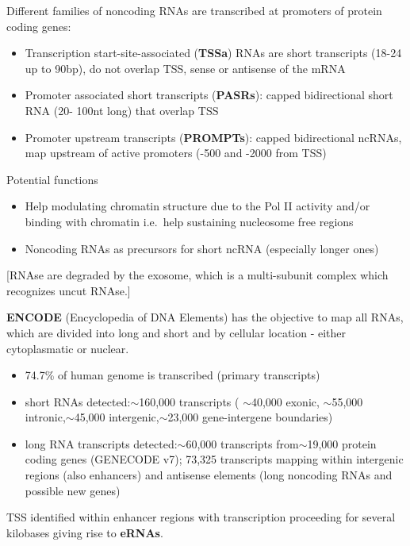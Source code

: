Different families of noncoding RNAs are transcribed at promoters of protein coding genes:

\begin{itemize}
\tightlist
\item
  Transcription start-site-associated (\textbf{TSSa}) RNAs are short transcripts (18-24 up to 90bp), do not overlap TSS, sense or antisense of the mRNA
\item
  Promoter associated short transcripts (\textbf{PASRs}): capped bidirectional short RNA (20- 100nt long) that overlap TSS
\item
  Promoter upstream transcripts (\textbf{PROMPTs}): capped bidirectional ncRNAs, map upstream of active promoters (-500 and -2000 from TSS)
\end{itemize}

Potential functions
\begin{itemize}
\item Help modulating chromatin structure due to the Pol II activity and/or binding with chromatin i.e.~help sustaining nucleosome free regions
\item  Noncoding RNAs as precursors for short ncRNA (especially longer ones)
\end{itemize}

{[}RNAse are degraded by the exosome, which is a multi-subunit complex which recognizes uncut RNAse.{]}

\textbf{ENCODE} (Encyclopedia of DNA Elements) has the objective to map all RNAs, which are divided into long and short and by cellular location - either cytoplasmatic or nuclear.

\begin{itemize}
\tightlist
\item
  74.7\% of human genome is transcribed (primary transcripts)
\item
  short RNAs detected:$\sim$160,000 transcripts ( $\sim$40,000 exonic, $\sim$55,000 intronic,$\sim$45,000 intergenic,$\sim$23,000 gene-intergene boundaries)
\item
  long RNA transcripts detected:$\sim$60,000 transcripts from$\sim$19,000 protein coding genes (GENECODE v7); 73,325 transcripts mapping within intergenic regions (also enhancers) and antisense elements (long noncoding RNAs and possible new genes)
\end{itemize}

TSS identified within enhancer regions with transcription proceeding for several kilobases giving rise to \textbf{eRNAs}.


